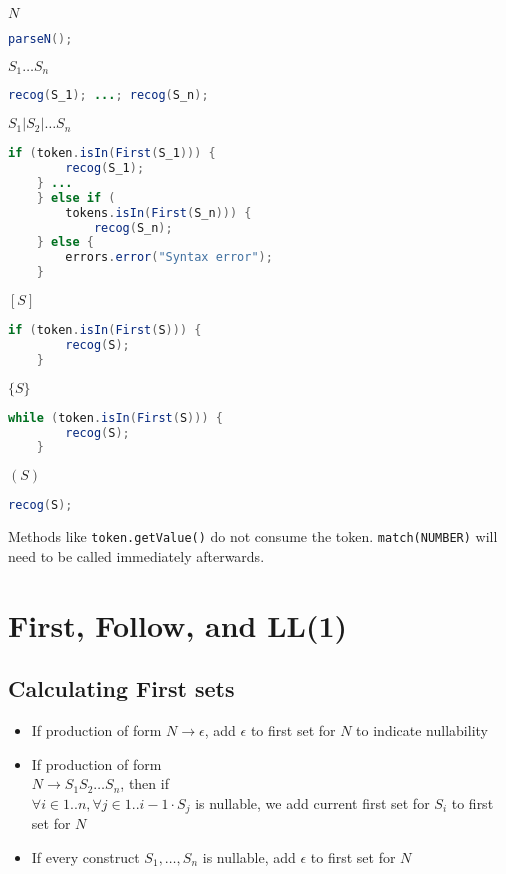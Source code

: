 \documentclass[fontsize=10pt,a4paper]{article}
\begin{document}
\begin{multicols}{3}
    $N$
    \begin{lstlisting}[language=Java]
    parseN();
    \end{lstlisting}

    $S_1 \dots S_n$
    \begin{lstlisting}[language=Java]
    recog(S_1); ...; recog(S_n);
    \end{lstlisting}

    $S_1 \vert S_2 \vert \dots S_n$
    \begin{lstlisting}[language=Java]
    if (token.isIn(First(S_1))) {
        recog(S_1);
    } ...
    } else if (
        tokens.isIn(First(S_n))) {
            recog(S_n);
    } else {
        errors.error("Syntax error");
    }
    \end{lstlisting}



    $[S]$
    \begin{lstlisting}[language=Java]
    if (token.isIn(First(S))) {
        recog(S);
    }
    \end{lstlisting}

    $\{S\}$
    \begin{lstlisting}[language=Java]
    while (token.isIn(First(S))) {
        recog(S);
    }
    \end{lstlisting}

    $(S)$
    \begin{lstlisting}[language=Java]
    recog(S);
    \end{lstlisting}


    Methods like \texttt{token.getValue()} do not consume the token. \texttt{match(NUMBER)} will need to be called immediately afterwards.

    \section{First, Follow, and LL(1)}


    \subsection{Calculating First sets}

    \begin{itemize}
        \item If production of form $N \rightarrow \epsilon$, add $\epsilon$ to first set for $N$ to indicate nullability
        \item If production of form \\$N \rightarrow S_1 S_2 \ldots S_n$, then if \\$\forall i \in 1..n, \forall j \in 1..i-1 \cdot S_j$ is nullable, we add current first set for $S_i$ to first set for $N$
        \item If every construct $S_1, \ldots, S_n$ is nullable, add $\epsilon$ to first set for $N$
    \end{itemize}


\end{multicols}
\end{document}
